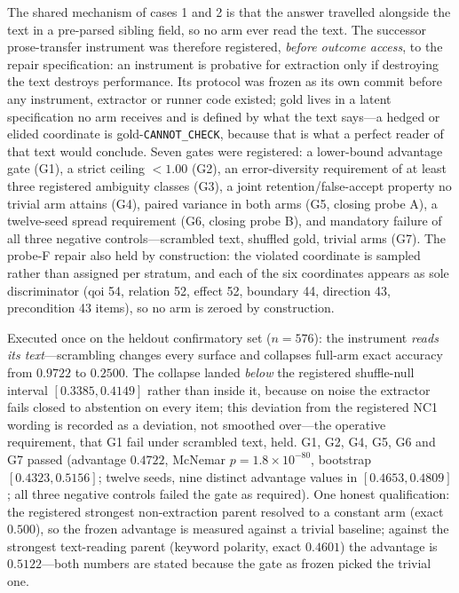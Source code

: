 The shared mechanism of cases 1 and 2 is that the answer travelled alongside the text in a pre-parsed sibling field, so no arm ever read the text. The successor prose-transfer instrument was therefore registered, \emph{before outcome access}, to the repair specification: an instrument is probative for extraction only if destroying the text destroys performance. Its protocol was frozen as its own commit before any instrument, extractor or runner code existed; gold lives in a latent specification no arm receives and is defined by what the text says---a hedged or elided coordinate is gold-\texttt{CANNOT\_CHECK}, because that is what a perfect reader of that text would conclude. Seven gates were registered: a lower-bound advantage gate (G1), a strict ceiling $<1.00$ (G2), an error-diversity requirement of at least three registered ambiguity classes (G3), a joint retention/false-accept property no trivial arm attains (G4), paired variance in both arms (G5, closing probe A), a twelve-seed spread requirement (G6, closing probe B), and mandatory failure of all three negative controls---scrambled text, shuffled gold, trivial arms (G7). The probe-F repair also held by construction: the violated coordinate is sampled rather than assigned per stratum, and each of the six coordinates appears as sole discriminator (qoi 54, relation 52, effect 52, boundary 44, direction 43, precondition 43 items), so no arm is zeroed by construction.

Executed once on the heldout confirmatory set ($n=576$): the instrument \emph{reads its text}---scrambling changes every surface and collapses full-arm exact accuracy from $0.9722$ to $0.2500$. The collapse landed \emph{below} the registered shuffle-null interval $[0.3385,0.4149]$ rather than inside it, because on noise the extractor fails closed to abstention on every item; this deviation from the registered NC1 wording is recorded as a deviation, not smoothed over---the operative requirement, that G1 fail under scrambled text, held. G1, G2, G4, G5, G6 and G7 passed (advantage $0.4722$, McNemar $p=1.8\times10^{-80}$, bootstrap $[0.4323,0.5156]$; twelve seeds, nine distinct advantage values in $[0.4653,0.4809]$; all three negative controls failed the gate as required). One honest qualification: the registered strongest non-extraction parent resolved to a constant arm (exact $0.500$), so the frozen advantage is measured against a trivial baseline; against the strongest text-reading parent (keyword polarity, exact $0.4601$) the advantage is $0.5122$---both numbers are stated because the gate as frozen picked the trivial one.

